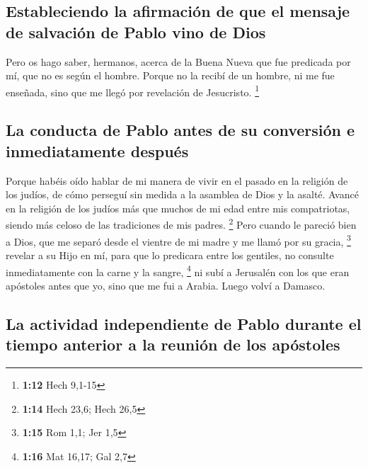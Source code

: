 \hypertarget{estableciendo-la-afirmaciuxf3n-de-que-el-mensaje-de-salvaciuxf3n-de-pablo-vino-de-dios}{%
\subsection{Estableciendo la afirmación de que el mensaje de salvación
de Pablo vino de
Dios}\label{estableciendo-la-afirmaciuxf3n-de-que-el-mensaje-de-salvaciuxf3n-de-pablo-vino-de-dios}}

 Pero os hago saber, hermanos, acerca de la Buena Nueva
que fue predicada por mí, que no es según el hombre. 
Porque no la recibí de un hombre, ni me fue enseñada, sino que me llegó
por revelación de Jesucristo. \footnote{\textbf{1:12} Hech 9,1-15}

\hypertarget{la-conducta-de-pablo-antes-de-su-conversiuxf3n-e-inmediatamente-despuuxe9s}{%
\subsection{La conducta de Pablo antes de su conversión e inmediatamente
después}\label{la-conducta-de-pablo-antes-de-su-conversiuxf3n-e-inmediatamente-despuuxe9s}}

 Porque habéis oído hablar de mi manera de vivir en el
pasado en la religión de los judíos, de cómo perseguí sin medida a la
asamblea de Dios y la asalté.  Avancé en la religión de
los judíos más que muchos de mi edad entre mis compatriotas, siendo más
celoso de las tradiciones de mis padres. \footnote{\textbf{1:14} Hech
  23,6; Hech 26,5}  Pero cuando le pareció bien a Dios,
que me separó desde el vientre de mi madre y me llamó por su gracia,
\footnote{\textbf{1:15} Rom 1,1; Jer 1,5}  \,revelar a su
Hijo en mí, para que lo predicara entre los gentiles, no consulte
inmediatamente con la carne y la sangre, \footnote{\textbf{1:16} Mat
  16,17; Gal 2,7}  ni subí a Jerusalén con los que eran
apóstoles antes que yo, sino que me fui a Arabia. Luego volví a Damasco.

\hypertarget{la-actividad-independiente-de-pablo-durante-el-tiempo-anterior-a-la-reuniuxf3n-de-los-apuxf3stoles}{%
\subsection{La actividad independiente de Pablo durante el tiempo
anterior a la reunión de los
apóstoles}\label{la-actividad-independiente-de-pablo-durante-el-tiempo-anterior-a-la-reuniuxf3n-de-los-apuxf3stoles}}

